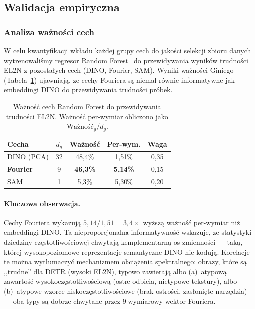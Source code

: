 \subsection{Walidacja empiryczna}
\label{sec:fourier_validation}

\subsubsection{Analiza ważności cech}
\label{sec:feature_importance}

W celu kwantyfikacji wkładu każdej grupy cech do jakości selekcji zbioru
danych wytrenowaliśmy regresor Random Forest~\cite{breiman2001random}
do przewidywania wyników trudności EL2N z pozostałych cech (DINO, Fourier,
SAM).  Wyniki ważności Giniego (Tabela~\ref{tab:rf_importance}) ujawniają,
ze cechy Fouriera są niemal równie informatywne jak embeddingi DINO do
przewidywania trudności próbek.

\begin{table}[h]
\centering
\caption{Ważność cech Random Forest do przewidywania trudności EL2N.
         Ważność per-wymiar obliczono jako
         $\text{Ważność}_g / d_g$.}
\label{tab:rf_importance}
\begin{tabular}{lcccc}
\toprule
\textbf{Cecha} & $d_g$ & \textbf{Ważność} &
    \textbf{Per-wym.} & \textbf{Waga} \\
\midrule
DINO (PCA)       & 32 & 48{,}4\% & 1{,}51\% & 0{,}35 \\
\textbf{Fourier} &  9 & \textbf{46{,}3\%} & \textbf{5{,}14\%} & 0{,}15 \\
SAM              &  1 &  5{,}3\% & 5{,}30\% & 0{,}20 \\
\bottomrule
\end{tabular}
\end{table}

\paragraph{Kluczowa obserwacja.}
Cechy Fouriera wykazują $5{,}14 / 1{,}51 = 3{,}4\times$ wyższą ważność
per-wymiar niż embeddingi DINO.  Ta nieproporcjonalna informatywność wskazuje,
ze statystyki dziedziny częstotliwościowej chwytają komplementarną os
zmienności --- taką, której wysokopoziomowe reprezentacje semantyczne DINO
nie kodują.  Korelacje te można wytłumaczyć mechanizmem obciążenia
spektralnego: obrazy, które są ,,trudne'' dla DETR (wysoki EL2N), typowo
zawierają albo (a)~atypową zawartość wysokoczęstotliwościową (ostre odbicia,
nietypowe tekstury), albo (b)~atypowe wzorce niskoczęstotliwościowe (brak
ostrości, zasłonięte narzędzia) --- oba typy są dobrze chwytane przez
9-wymiarowy wektor Fouriera.

